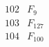 \documentclass{article}
\begin{document}
{$$\begin{array}{|r|*{7}{r|}}
\\
\hline
102 
 & F_{9} &
 & 
 & 
 & 
 & 
 & 
\\
\hline
103 
 & F_{127} &
 & 
 & 
 & 
 & 
 & 
\\
\hline
104 
 & F_{100} &
 & 
 & 
 & 

\end{array}$$}
\end{document}
